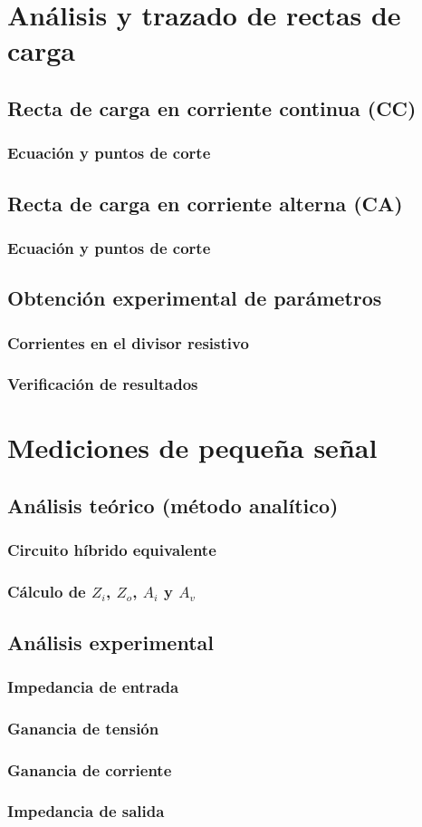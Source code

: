 \documentclass[chaptersright]{informeutn}
\begin{document}
\chapter{Análisis y trazado de rectas de carga}
  \section{Recta de carga en corriente continua (CC)}
    \subsection{Ecuación y puntos de corte}
  \section{Recta de carga en corriente alterna (CA)}
    \subsection{Ecuación y puntos de corte}
  \section{Obtención experimental de parámetros}
    \subsection{Corrientes en el divisor resistivo}
    \subsection{Verificación de resultados}

\chapter{Mediciones de pequeña señal}
  \section{Análisis teórico (método analítico)}
    \subsection{Circuito híbrido equivalente}
    \subsection{Cálculo de $Z_i$, $Z_o$, $A_i$ y $A_v$}
  \section{Análisis experimental}
    \subsection{Impedancia de entrada}
    \subsection{Ganancia de tensión}
    \subsection{Ganancia de corriente}
    \subsection{Impedancia de salida}
\end{document}
